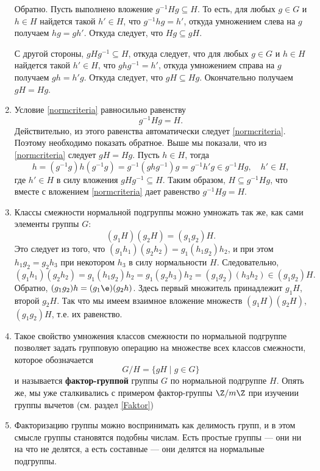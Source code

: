 \begin{enumerate}
Обратно. Пусть выполнено вложение $g^{-1}Hg\subseteq H$. То есть, для любых $g\in G$ и $h\in H$ найдется такой $h'\in H$, что $g^{-1}hg=h'$, откуда умножением слева на $g$ получаем $hg=gh'$. Откуда следует, что $Hg\subseteq gH$.

С другой стороны, $gHg^{-1}\subseteq H$, откуда следует, что для любых $g\in G$ и $h\in H$ найдется такой $h'\in H$, что $ghg^{-1}=h'$, откуда умножением справа на $g$ получаем $gh=h'g$. Откуда следует, что $gH\subseteq Hg$. Окончательно получаем $gH=Hg$.

\item Условие \eqref{normcriteria} равносильно равенству
$$
g^{-1}Hg=H.
$$
Действительно, из этого равенства автоматически следует \eqref{normcriteria}. Поэтому необходимо показать обратное. Выше мы показали, что из \eqref{normcriteria} следует $gH=Hg$. Пусть $h\in H$, тогда
$$
h=(g^{-1}g)h(g^{-1}g)=g^{-1}(ghg^{-1})g=g^{-1}h'g\in g^{-1}Hg,\quad h'\in H,
$$
где $h'\in H$ в силу вложения $gHg^{-1}\subseteq H$. Таким образом, $H\subseteq g^{-1}Hg$, что вместе с вложением \eqref{normcriteria} дает равенство $g^{-1}Hg=H$.


\item Классы смежности нормальной подгруппы можно умножать так же, как сами элементы группы $G$:
$$
(g_1H)(g_2H)=(g_1g_2)H.
$$
Это следует из того, что $(g_1h_1)(g_2h_2)=g_1(h_1g_2)h_2$, и при этом $h_1g_2=g_2h_3$ при некотором $h_3$ в силу нормальности $H$. Следовательно,
$$
(g_1h_1)(g_2h_2) = g_1(h_1g_2)h_2 = g_1(g_2h_3)h_2=(g_1g_2)(h_3h_2)\in (g_1g_2)H.
$$
Обратно, $(g_1g_2)h=(g_1\e)(g_2h)$. Здесь первый множитель принадлежит $g_1H$, второй $g_2H$. Так что мы имеем взаимное вложение множеств $(g_1H)(g_2H)$, $(g_1g_2)H$, т.е. их равенство.

\item Такое свойство умножения классов смежности по нормальной подгруппе позволяет задать групповую операцию на множестве всех классов смежности, которое обозначается
$$
G/H = \{gH\mid g\in G\}
$$
и называется \textbf{фактор-группой} группы $G$ по нормальной подгруппе $H$. Опять же, мы уже сталкивались с примером фактор-группы $\Z/m\Z$ при изучении группы вычетов (см. раздел \ref{Faktor})

\item Факторизацию группы можно воспринимать как делимость групп, и в этом смысле группы становятся подобны числам. Есть простые группы --- они ни на что не делятся, а есть составные --- они делятся на нормальные подгруппы.


\end{enumerate}
